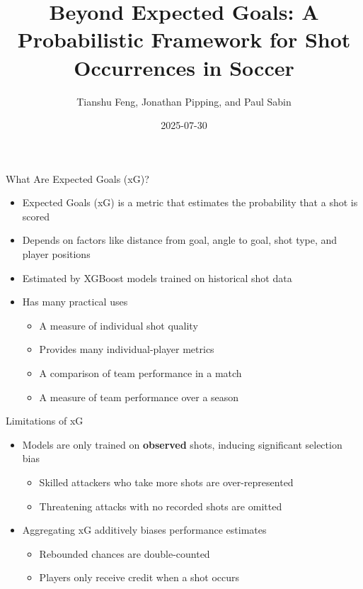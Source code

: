 \documentclass[
  11pt,
  ignorenonframetext,
]{beamer}
\title[Beyond Expected Goals]{Beyond Expected Goals: A Probabilistic
Framework for Shot Occurrences in Soccer}
\author[Feng, T., Pipping, J., \& Sabin, P.]{Tianshu Feng, Jonathan
Pipping, and Paul Sabin}
\date{2025-07-30}
\institute[UPenn]{University of Pennsylvania}
\providecommand{\tightlist}{%
  \setlength{\itemsep}{0pt}\setlength{\parskip}{0pt}}
\begin{document}
\frame{\titlepage}

\begin{frame}{What Are Expected Goals (xG)?}
\protect{}\label{what-are-expected-goals-xg}
\begin{itemize}
\tightlist
\item
  Expected Goals (xG) is a metric that estimates the probability that a
  shot is scored
\item
  Depends on factors like distance from goal, angle to goal, shot type,
  and player positions
\item
  Estimated by XGBoost models trained on historical shot data
\item
  Has many practical uses

  \begin{itemize}
  \tightlist
  \item
    A measure of individual shot quality
  \item
    Provides many individual-player metrics
  \item
    A comparison of team performance in a match
  \item
    A measure of team performance over a season
  \end{itemize}
\end{itemize}
\end{frame}

\begin{frame}{Limitations of xG}
\protect{}\label{limitations-of-xg}
\begin{itemize}
\tightlist
\item
  Models are only trained on \textbf{observed} shots, inducing
  significant selection bias

  \begin{itemize}
  \tightlist
  \item
    Skilled attackers who take more shots are over-represented
  \item
    Threatening attacks with no recorded shots are omitted
  \end{itemize}
\item
  Aggregating xG additively biases performance estimates

  \begin{itemize}
  \tightlist
  \item
    Rebounded chances are double-counted
  \item
    Players only receive credit when a shot occurs
  \end{itemize}
\end{itemize}
\end{frame}
\end{document}
